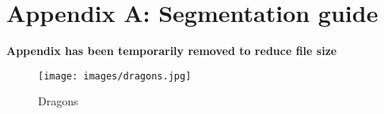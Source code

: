 \appendix

\chapter{Appendix A: Segmentation guide}\label{a:guide}
%
\textbf{Appendix has been temporarily removed to reduce file size}

\begin{figure}[h]
	\centerline{
		\texttt{[image: images/dragons.jpg]}}
	\caption{Dragons}
\end{figure}



% 


% 

% 
